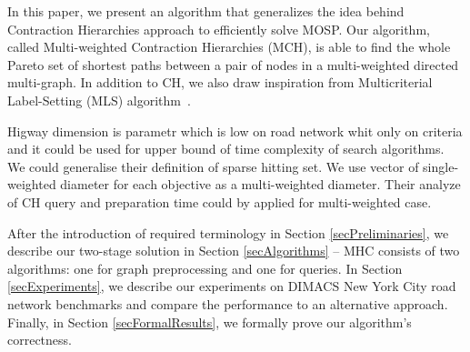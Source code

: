 
In this paper, we present an algorithm that generalizes the idea behind Contraction
Hierarchies approach to efficiently solve MOSP. Our algorithm, called
Multi-weighted Contraction Hierarchies (MCH), is able to find the whole Pareto
set of shortest paths between a pair of nodes in a multi-weighted directed
multi-graph. In addition to CH, we also draw inspiration from Multicriterial
Label-Setting (MLS) algorithm~\cite{martins1984multicriteria}. 



Higway dimension  \cite{abraham2016highway} is parametr which is low on road
network whit only on criteria and it could be used for upper bound of time
complexity of search algorithms. We could generalise their definition of 
sparse hitting set. We use vector of single-weighted diameter for each objective
as a multi-weighted diameter. Their analyze of CH query and preparation time
could by applied for multi-weighted case.




After the introduction of required terminology in Section
\ref{secPreliminaries}, we describe our two-stage solution in Section
\ref{secAlgorithms} -- MHC consists of two algorithms: one for 
graph preprocessing and one for queries. In Section
\ref{secExperiments}, we describe our experiments on DIMACS New York City road
network benchmarks and compare the performance to an alternative approach.
Finally, in Section \ref{secFormalResults}, we formally prove our algorithm's
correctness.

